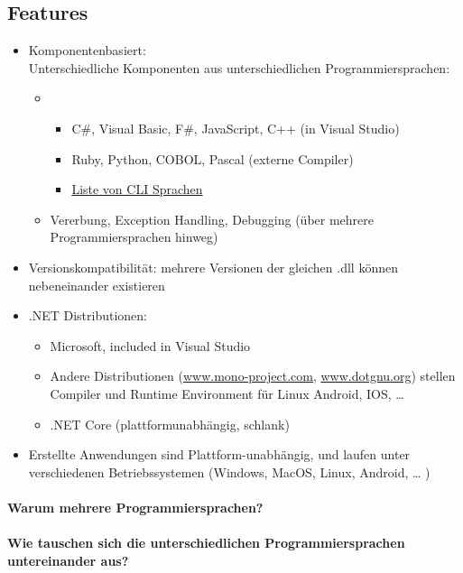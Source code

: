 \subsection{Features}
\begin{itemize}
\item Komponentenbasiert: \\
Unterschiedliche Komponenten aus unterschiedlichen Programmiersprachen:
\begin{itemize}
\item[]
\begin{itemize}
\item C\#, Visual Basic, F\#, JavaScript, C++ (in Visual Studio)
\item Ruby, Python, COBOL, Pascal (externe Compiler)
\item \href{https://en.wikipedia.org/wiki/List_of_CLI_languages}{Liste von CLI Sprachen}
\end{itemize}
\item Vererbung, Exception Handling, Debugging (über mehrere Programmiersprachen hinweg)
\end{itemize}
\item Versionskompatibilität: mehrere Versionen der gleichen .dll können nebeneinander existieren
\item .NET Distributionen:
\begin{itemize}
\item Microsoft, included in Visual Studio
\item Andere Distributionen (\href{http://www.mono-project.com}{www.mono-project.com}, \href{http://www.dotgnu.org}{www.dotgnu.org}) stellen Compiler und Runtime Environment für Linux Android, IOS, … 
\item .NET Core (plattformunabhängig, schlank)
\end{itemize}
\item Erstellte Anwendungen sind Plattform-unabhängig, und laufen unter verschiedenen Betriebssystemen (Windows, MacOS, Linux, Android, … ) 
\end{itemize}

\paragraph{Warum mehrere Programmiersprachen?}


\paragraph{Wie tauschen sich die unterschiedlichen Programmiersprachen untereinander aus?}

